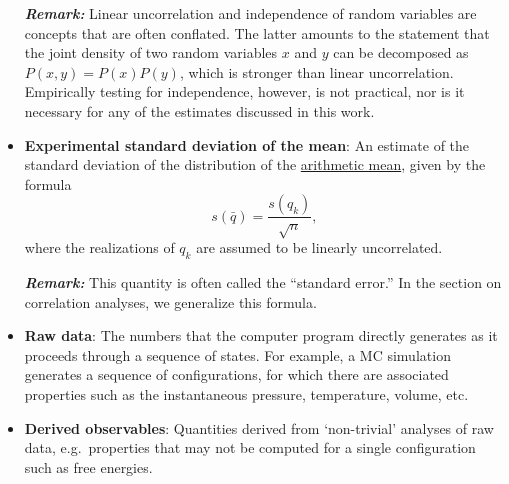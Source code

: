 \begin{itemize}
\smallskip

\textbf{\textit{Remark:}} Linear uncorrelation and independence of random variables are concepts that are often conflated.  The latter amounts to the statement that the joint density of two random variables $x$ and $y$ can be decomposed as $P(x,y)=P(x)P(y)$, which is stronger than linear uncorrelation.  Empirically testing for independence, however, is not practical, nor is it necessary for any of the estimates discussed in this work.
  
\item {\bf Experimental standard deviation of the mean}: An estimate of the standard deviation of the distribution of the \hyperref[def:arith_mean]{arithmetic mean}, given by the formula
  \begin{equation}
    s\left(\bar{q}\right) = \dfrac{s\left(q_k\right)}{\sqrt{n}}, \label{def:exp_st_dev_mean}
  \end{equation}
  where the realizations of $q_k$ are assumed to be linearly uncorrelated.
  
  

\smallskip
\textbf{\textit{Remark:}} This quantity is often called the ``standard error.''  In the section on correlation analyses, we generalize this formula.


  
\item {\bf Raw data}: The numbers that the computer program directly generates as it proceeds through a sequence of states.
For example, a MC simulation generates a sequence of configurations, for which there are associated properties such as the instantaneous pressure, temperature, volume, etc.
\label{def:raw_data}
\item {\bf Derived observables}: Quantities derived from `non-trivial' analyses of raw data, e.g.\ properties that may not be computed for a single configuration such as free energies.
  \label{def:deriv_obs}
  

\end{itemize}
